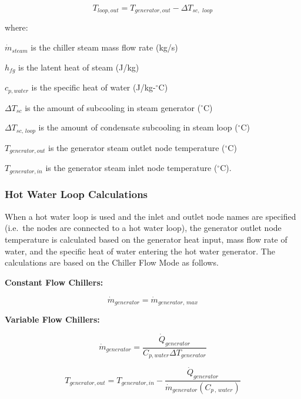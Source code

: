 \begin{equation}
{T_{loop,out}} = {T_{generator,out}} - \Delta {T_{sc,\,\,loop}}
\end{equation}

where:

\({\dot m_{steam}}\) is the chiller steam mass flow rate (kg/s)

\({h_{fg}}\) is the latent heat of steam (J/kg)

\({c_{p,water}}\) is the specific heat of water (J/kg-\(^{\circ}\)C)

\(\Delta {T_{sc}}\) is the amount of subcooling in steam generator (\(^{\circ}\)C)

\(\Delta {T_{sc,\,loop}}\) is the amount of condensate subcooling in steam loop (\(^{\circ}\)C)

\({T_{generator,out}}\) is the generator steam outlet node temperature (\(^{\circ}\)C)

\({T_{generator,in}}\) is the generator steam inlet node temperature (\(^{\circ}\)C).

\subsubsection{Hot Water Loop Calculations}\label{hot-water-loop-calculations-1}

When a hot water loop is used and the inlet and outlet node names are specified (i.e.~the nodes are connected to a hot water loop), the generator outlet node temperature is calculated based on the generator heat input, mass flow rate of water, and the specific heat of water entering the hot water generator. The calculations are based on the Chiller Flow Mode as follows.

\textbf{Constant Flow Chillers:}

\begin{equation}
{\dot m_{generator}} = {\dot m_{generator,\,max}}
\end{equation}

\textbf{Variable Flow Chillers:}

\begin{equation}
  \dot{m}_{generator} = \frac{\dot{Q}_{generator}}{C_{p,water}\Delta T_{generator}}
\end{equation}

\begin{equation}
{T_{generator,out}} = {T_{generator,in}} - \frac{{{{\dot Q}_{generator}}}}{{{{\dot m}_{generator}}\left( {{C_{p\,,\,water}}} \right)}}
\end{equation}

